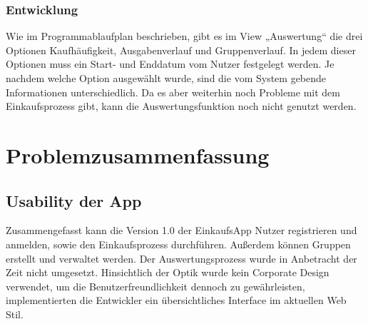 \documentclass[12pt,a4paper]{article}
\begin{document}
\subsubsection*{Entwicklung}
Wie im Programmablaufplan beschrieben, gibt es im View „Auswertung“ die drei Optionen Kaufhäufigkeit, Ausgabenverlauf und Gruppenverlauf. In jedem dieser Optionen muss ein Start- und Enddatum vom Nutzer festgelegt werden. Je nachdem welche Option ausgewählt wurde, sind die vom System gebende Informationen unterschiedlich. Da es aber weiterhin noch Probleme mit dem Einkaufsprozess gibt, kann die Auswertungsfunktion noch nicht genutzt werden.
\newpage
\section{Problemzusammenfassung}
\subsection{Usability der App}
Zusammengefasst kann die Version 1.0 der EinkaufsApp Nutzer registrieren und anmelden, sowie den Einkaufsprozess durchführen. Außerdem können Gruppen erstellt und verwaltet werden. Der Auswertungsprozess wurde in Anbetracht der Zeit nicht umgesetzt. Hinsichtlich der Optik wurde kein Corporate Design verwendet, um die Benutzerfreundlichkeit dennoch zu gewährleisten, implementierten die Entwickler ein übersichtliches Interface im aktuellen Web Stil.
\newpage
\end{document}
